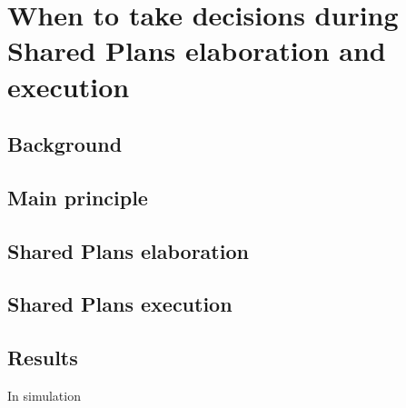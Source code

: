 \documentclass[english,a4paper,11pt,twoside]{StyleThese}
\begin{document}
\setcounter{chapter}{3} %
\dominitoc
\faketableofcontents
\fi

\chapter{When to take decisions during Shared Plans elaboration and execution}
\minitoc

\label{ch:SP}

\section{Background}

\section{Main principle}

\section{Shared Plans elaboration}

\section{Shared Plans execution}

\section{Results}

In simulation

\ifdefined{}
\else


\end{document}
